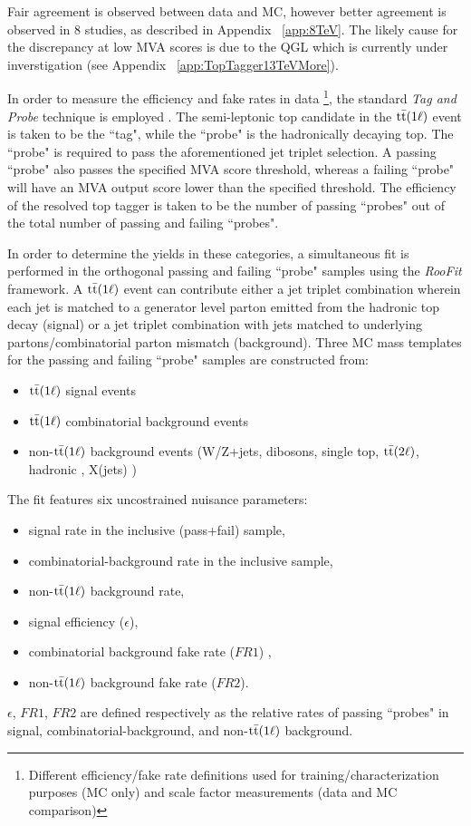 Fair agreement is observed between data and MC, however better agreement is observed in 8\:\TeV\: studies, as described in Appendix ~\ref{app:8TeV}. The likely cause for the discrepancy at low MVA scores is due to the QGL which is currently under inverstigation (see Appendix ~\ref{app:TopTagger13TeVMore}).

In order to measure the efficiency and fake rates in data \footnote{Different efficiency/fake rate definitions used for training/characterization purposes (MC only) and scale factor measurements (data and MC comparison)}, the standard \textit{Tag and Probe} technique is employed \cite{TnP}. The semi-leptonic top candidate in the $\mathrm{t}\bar{\mathrm{t}}(1\ell)$ event is taken to be the ``tag", while the ``probe" is the hadronically decaying top.
 The ``probe" is required to pass the aforementioned jet triplet selection. A passing ``probe" also passes the specified MVA score threshold, whereas a failing ``probe" will have an MVA output score lower than the specified threshold. The efficiency of the resolved top tagger is taken to be the number of passing ``probes" out of the total number of passing and failing ``probes".

In order to determine the yields in these categories, a simultaneous fit is performed in the orthogonal passing and failing ``probe" samples using the \textit{RooFit} framework. A $\mathrm{t}\bar{\mathrm{t}}(1\ell)$ event can contribute either a jet triplet combination wherein each jet is matched to a generator level parton emitted from the hadronic top decay (signal) or a jet triplet combination with jets matched to underlying partons/combinatorial parton mismatch (background). Three  MC mass templates for the passing and failing ``probe" samples are constructed from:

\begin{itemize}
\item $\mathrm{t}\bar{\mathrm{t}}(1\ell)$ signal events
\item $\mathrm{t}\bar{\mathrm{t}}(1\ell)$ combinatorial background events
\item non-$\mathrm{t}\bar{\mathrm{t}}(1\ell)$ background events (W/Z+jets, dibosons, single top, $\mathrm{t}\bar{\mathrm{t}}(2\ell)$, hadronic \ttbar, \ttbar X(jets) )
\end{itemize}		 
	
The fit features six uncostrained nuisance parameters: 
\begin{itemize}
 \item signal rate in the inclusive (pass+fail) sample,
 \item combinatorial-background rate in the inclusive sample,  
 \item non-$\mathrm{t}\bar{\mathrm{t}}(1\ell)$ background rate,
 \item signal efficiency ($\epsilon$), 
 \item combinatorial background fake rate ($FR1$) ,
 \item non-$\mathrm{t}\bar{\mathrm{t}}(1\ell)$ background fake rate ($FR2$). 
 \end{itemize} 
 $\epsilon$, $FR1$, $FR2$ are defined respectively as the relative rates of passing ``probes" in signal, combinatorial-background, and non-$\mathrm{t}\bar{\mathrm{t}}(1\ell)$ background.
 
